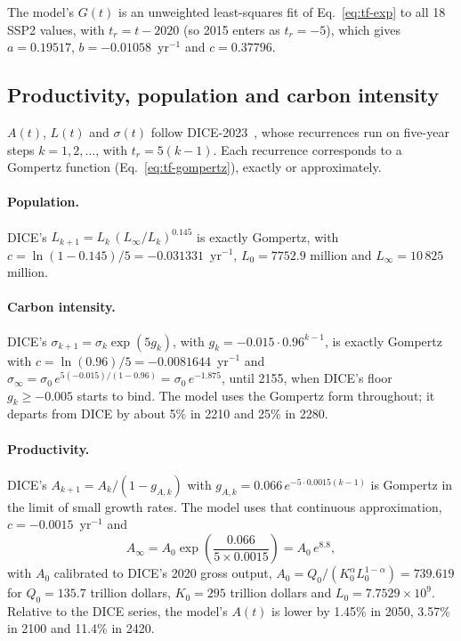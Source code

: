\documentclass[11pt]{article}
\begin{document}
The model's $G(t)$ is an unweighted least-squares fit of
Eq.~\eqref{eq:tf-exp} to all 18 SSP2 values, with $t_r = t - 2020$ (so 2015
enters as $t_r = -5$), which gives $a = 0.19517$, $b = -0.01058$~yr$^{-1}$
and $c = 0.37796$.

\subsection{Productivity, population and carbon intensity}
\label{sec:dice-fits}

$A(t)$, $L(t)$ and $\sigma(t)$ follow DICE-2023~\cite{BarrageNordhaus2024},
whose recurrences run on five-year steps $k = 1, 2, \dots$, with
$t_r = 5(k-1)$. Each recurrence corresponds to a Gompertz function
(Eq.~\ref{eq:tf-gompertz}), exactly or approximately.

\paragraph{Population.} DICE's $L_{k+1} = L_k\,(L_\infty/L_k)^{0.145}$ is
exactly Gompertz, with $c = \ln(1-0.145)/5 = -0.031331$~yr$^{-1}$,
$L_0 = 7752.9$ million and $L_\infty = 10\,825$ million.

\paragraph{Carbon intensity.} DICE's $\sigma_{k+1} = \sigma_k
\exp(5g_k)$, with $g_k = -0.015\cdot0.96^{k-1}$, is exactly Gompertz with
$c = \ln(0.96)/5 = -0.0081644$~yr$^{-1}$ and
$\sigma_\infty = \sigma_0\,e^{5(-0.015)/(1-0.96)} = \sigma_0\,e^{-1.875}$, until
2155, when DICE's floor $g_k\ge-0.005$ starts to bind. The model uses the
Gompertz form throughout; it departs from DICE by about 5\% in 2210 and 25\% in
2280.

\paragraph{Productivity.} DICE's $A_{k+1} = A_k/(1-g_{A,k})$ with
$g_{A,k} = 0.066\,e^{-5\cdot0.0015(k-1)}$ is Gompertz in the limit of small
growth rates. The model uses that continuous approximation,
$c = -0.0015$~yr$^{-1}$ and
\begin{equation}
  A_\infty = A_0\exp\!\left(\frac{0.066}{5\times0.0015}\right) = A_0\,e^{8.8},
\end{equation}
with $A_0$ calibrated to DICE's 2020 gross output,
$A_0 = Q_0/(K_0^{\alpha}L_0^{1-\alpha}) = 739.619$ for $Q_0 = 135.7$ trillion
dollars, $K_0 = 295$ trillion dollars and $L_0 = 7.7529\times10^{9}$. Relative
to the DICE series, the model's $A(t)$ is lower by 1.45\% in 2050, 3.57\% in
2100 and 11.4\% in 2420.
\end{document}
